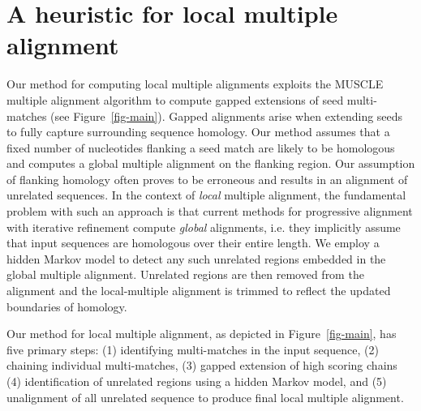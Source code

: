 \documentclass{ws-procs975x65}
\begin{document}
\section{A heuristic for local multiple alignment}
Our method for computing local multiple alignments exploits the MUSCLE multiple alignment algorithm to compute gapped extensions of seed multi-matches (see Figure~\ref{fig-main}). Gapped alignments arise when extending seeds to fully capture surrounding sequence homology. Our method assumes that a fixed number of nucleotides flanking a seed match are likely to be homologous and computes a global multiple alignment on the flanking region.  Our assumption of flanking homology often proves to be erroneous and results in an alignment of unrelated sequences.  In the context of \textit{local} multiple alignment, the fundamental problem with such an approach is that current methods for progressive alignment with iterative refinement compute \textit{global} alignments, i.e. they implicitly assume that input sequences are homologous over their entire length.  We employ a hidden Markov model to detect any such unrelated regions embedded in the global multiple alignment.  Unrelated regions are then removed from the alignment and the local-multiple alignment is trimmed to reflect the updated boundaries of homology.

Our method for local multiple alignment, as depicted in Figure~\ref{fig-main},
has five primary steps: (1) identifying multi-matches in the input sequence, (2) chaining individual multi-matches, (3) gapped extension of high scoring chains (4) identification of unrelated regions using a hidden Markov model, and (5) unalignment of all unrelated sequence to produce final local multiple alignment.
\end{document}
